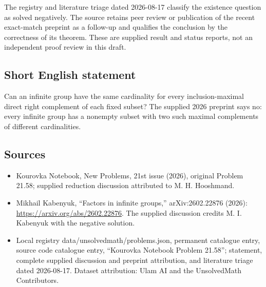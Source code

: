 \documentclass[11pt]{article}
\begin{document}
The registry and literature triage dated 2026-08-17 classify the existence question as solved negatively. The source retains peer review or publication of the recent exact-match preprint as a follow-up and qualifies the conclusion by the correctness of its theorem. These are supplied result and status reports, not an independent proof review in this draft.
\subsection{Short English statement}
Can an infinite group have the same cardinality for every inclusion-maximal direct right complement of each fixed subset? The supplied 2026 preprint says no: every infinite group has a nonempty subset with two such maximal complements of different cardinalities.
\subsection{Sources}
\begin{itemize}
\item Kourovka Notebook, New Problems, 21st issue (2026), original Problem 21.58; supplied reduction discussion attributed to M. H. Hooshmand.
\item Mikhail Kabenyuk, ``Factors in infinite groups,'' arXiv:2602.22876 (2026): \url{https://arxiv.org/abs/2602.22876}. The supplied discussion credits M. I. Kabenyuk with the negative solution.
\item Local registry data/unsolvedmath/problems.json, permanent catalogue entry, source code catalogue entry, ``Kourovka Notebook Problem 21.58''; statement, complete supplied discussion and preprint attribution, and literature triage dated 2026-08-17. Dataset attribution: Ulam AI and the UnsolvedMath Contributors.
\end{itemize}
\end{document}
